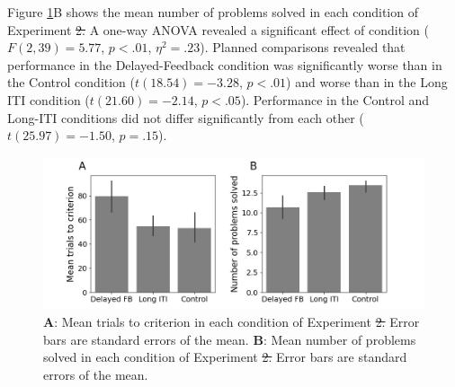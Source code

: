 \documentclass[doc, floatsintext]{apa7}
\providecommand{\DIFadd}[1]{{\protect\color{blue}\uwave{#1}}} %
\providecommand{\DIFdel}[1]{{\protect\color{red}\sout{#1}}}                      %
\providecommand{\DIFaddbegin}{} %
\providecommand{\DIFaddend}{} %
\providecommand{\DIFdelbegin}{} %
\providecommand{\DIFdelend}{} %
\providecommand{\DIFaddFL}[1]{\DIFadd{#1}} %
\providecommand{\DIFdelFL}[1]{\DIFdel{#1}} %
\providecommand{\DIFaddbeginFL}{} %
\providecommand{\DIFaddendFL}{} %
\providecommand{\DIFdelbeginFL}{} %
\providecommand{\DIFdelendFL}{} %
\newcommand{\DIFscaledelfig}{0.5}
\newlength{\DIFdelgraphicswidth} %
\newlength{\DIFdelgraphicsheight} %
\newcommand{\DIFaddincludegraphics}[2][]{{\color{blue}\fbox{\DIFOincludegraphics[#1]{#2}}}} %
\newcommand{\DIFdelincludegraphics}[2][]{%
\sbox{\DIFdelgraphicsbox}{\DIFOincludegraphics[#1]{#2}}%
\settoboxwidth{\DIFdelgraphicswidth}{\DIFdelgraphicsbox} %
\settoboxtotalheight{\DIFdelgraphicsheight}{\DIFdelgraphicsbox} %
\scalebox{\DIFscaledelfig}{%
\parbox[b]{\DIFdelgraphicswidth}{\usebox{\DIFdelgraphicsbox}\\[-\baselineskip] \rule{\DIFdelgraphicswidth}{0em}}\llap{\resizebox{\DIFdelgraphicswidth}{\DIFdelgraphicsheight}{%
\setlength{\unitlength}{\DIFdelgraphicswidth}%
\begin{picture}(1,1)%
\thicklines\linethickness{2pt} %
{\color[rgb]{1,0,0}\put(0,0){\framebox(1,1){}}}%
{\color[rgb]{1,0,0}\put(0,0){\line( 1,1){1}}}%
{\color[rgb]{1,0,0}\put(0,1){\line(1,-1){1}}}%
\end{picture}%
}\hspace*{3pt}}} %
} %
\DeclareRobustCommand{\DIFaddbegin}{\DIFOaddbegin \let\includegraphics\DIFaddincludegraphics} %
\DeclareRobustCommand{\DIFaddend}{\DIFOaddend \let\includegraphics\DIFOincludegraphics} %
\DeclareRobustCommand{\DIFdelbegin}{\DIFOdelbegin \let\includegraphics\DIFdelincludegraphics} %
\DeclareRobustCommand{\DIFdelend}{\DIFOaddend \let\includegraphics\DIFOincludegraphics} %
\DeclareRobustCommand{\DIFaddbeginFL}{\DIFOaddbeginFL \let\includegraphics\DIFaddincludegraphics} %
\DeclareRobustCommand{\DIFaddendFL}{\DIFOaddendFL \let\includegraphics\DIFOincludegraphics} %
\DeclareRobustCommand{\DIFdelbeginFL}{\DIFOdelbeginFL \let\includegraphics\DIFdelincludegraphics} %
\DeclareRobustCommand{\DIFdelendFL}{\DIFOaddendFL \let\includegraphics\DIFOincludegraphics} %
\begin{document}
\DIFdelbegin %

\DIFdelend Figure \ref{fig_exp_1_t2c}B shows the mean number of
problems solved in each condition of Experiment \DIFdelbegin \DIFdel{2. }\DIFdelend \DIFaddbegin \DIFadd{1. }\DIFaddend A one-way
ANOVA revealed a significant effect of condition ($F(2, 39)
= 5.77$, $p < .01$, $\eta^2 = .23$). Planned comparisons
revealed that performance in the Delayed-Feedback condition
was significantly worse than in the Control condition
($t(18.54) = -3.28$, $p < .01$) and worse than in the Long
ITI condition ($t(21.60) = -2.14$, $p < .05$).  Performance
in the Control and Long-ITI conditions did not differ
significantly from each other ($t(25.97) = -1.50$, $p=.15$).

\DIFdelbegin %

\DIFdelend \begin{figure}
  \centering
  \includegraphics[width=.8\textwidth]{../figures/fig_exp_1_t2c.png}
    \caption{
        \textbf{A}: Mean trials to criterion in each
        condition of Experiment \DIFdelbeginFL \DIFdelFL{2. }\DIFdelendFL \DIFaddbeginFL \DIFaddFL{1. }\DIFaddendFL Error bars are standard
        errors of the mean.
        \textbf{B}: Mean number of problems solved in each
        condition of Experiment \DIFdelbeginFL \DIFdelFL{2. }\DIFdelendFL \DIFaddbeginFL \DIFaddFL{1. }\DIFaddendFL Error bars are standard
        errors of the mean.
}
  \label{fig_exp_1_t2c}
\end{figure}
\end{document}
